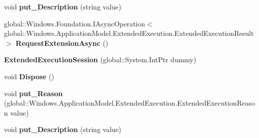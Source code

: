 \begin{DoxyCompactItemize}
\item 
\mbox{\label{class_windows_1_1_application_model_1_1_extended_execution_1_1_extended_execution_session_af499c01b24316417ab837241cbc579f3}} 
void {\bfseries put\+\_\+\+Description} (string value)
\item 
\mbox{\label{class_windows_1_1_application_model_1_1_extended_execution_1_1_extended_execution_session_adc9b60c4fdd1c687858d54fff5085a7e}} 
global\+::\+Windows.\+Foundation.\+I\+Async\+Operation$<$ global\+::\+Windows.\+Application\+Model.\+Extended\+Execution.\+Extended\+Execution\+Result $>$ {\bfseries Request\+Extension\+Async} ()
\item 
\mbox{\label{class_windows_1_1_application_model_1_1_extended_execution_1_1_extended_execution_session_a46bcb431911d1811af8851af151075c4}} 
{\bfseries Extended\+Execution\+Session} (global\+::\+System.\+Int\+Ptr dummy)
\item 
\mbox{\label{class_windows_1_1_application_model_1_1_extended_execution_1_1_extended_execution_session_a9a9b5dca28960f42d43054fca55a63f0}} 
void {\bfseries Dispose} ()
\item 
\mbox{\label{class_windows_1_1_application_model_1_1_extended_execution_1_1_extended_execution_session_aa358d0b0e3c44d87b444499323cd693e}} 
void {\bfseries put\+\_\+\+Reason} (global\+::\+Windows.\+Application\+Model.\+Extended\+Execution.\+Extended\+Execution\+Reason value)
\item 
\mbox{\label{class_windows_1_1_application_model_1_1_extended_execution_1_1_extended_execution_session_af499c01b24316417ab837241cbc579f3}} 
void {\bfseries put\+\_\+\+Description} (string value)
\item 
\mbox{\label{class_windows_1_1_application_model_1_1_extended_execution_1_1_extended_execution_session_adc9b60c4fdd1c687858d54fff5085a7e}} 

\end{DoxyCompactItemize}
